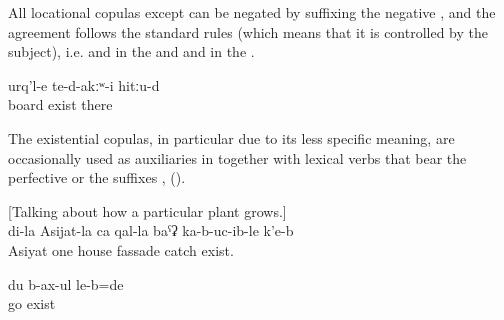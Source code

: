 All locational copulas except  can be negated by suffixing the negative , and the  agreement follows the standard rules (which means that it is controlled by the subject), i.e.  and   in the  and  and  in the  .
%
\begin{exe}
	\ex	\label{ex:There were no boards there}
	\gll	urq'l-e	te-d-akːʷ-i	hitːu-d\\
		board	exist	there\\
	\glt	{}
\end{exe}

The existential copulas, in particular  due to its less specific meaning, are occasionally used as auxiliaries in  together with lexical verbs that bear the perfective or the  suffixes ,  ().
%
\begin{exe}
	\ex	\label{ex:[Talking about how a particular plant grows.] ‎‎[It can become large], at my Asjiat's place it covered one wall of the house}
	[Talking about how a particular plant grows.]\\
	\gll	di-la	Asijat-la	ca	qal-la	baˁʡ	ka-b-uc-ib-le	k'e-b\\
			Asiyat	one	house	fassade	catch	exist.\\
	\glt	{}

	\ex	\label{ex:[at the time when the fox was born], I went run around (said the wolf)}
	\gll	du	b-ax-ul	le-b=de\\
			go	exist\\
	\glt	{}
\end{exe}



